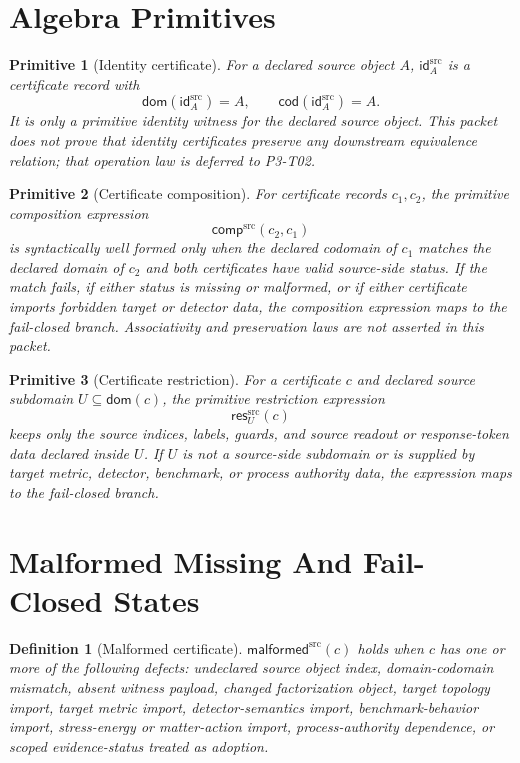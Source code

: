 \documentclass[11pt]{article}
\newcommand{\Cdom}{\mathsf{dom}}
\newcommand{\Ccod}{\mathsf{cod}}
\newcommand{\CId}{\mathsf{id}^{\mathrm{src}}}
\newcommand{\CComp}{\mathsf{comp}^{\mathrm{src}}}
\newcommand{\CRes}{\mathsf{res}^{\mathrm{src}}}
\newcommand{\CMalformed}{\mathsf{malformed}^{\mathrm{src}}}
\newtheorem{definition}{Definition}
\newtheorem{primitive}{Primitive}
\begin{document}
\section{Algebra Primitives}

\begin{primitive}[Identity certificate]
For a declared source object \(A\), \(\CId_A\) is a certificate record with
\[
  \Cdom(\CId_A)=A,\qquad \Ccod(\CId_A)=A.
\]
It is only a primitive identity witness for the declared source object. This
packet does not prove that identity certificates preserve any downstream
equivalence relation; that operation law is deferred to P3-T02.
\end{primitive}

\begin{primitive}[Certificate composition]
For certificate records \(c_1,c_2\), the primitive composition expression
\[
  \CComp(c_2,c_1)
\]
is syntactically well formed only when the declared codomain of \(c_1\)
matches the declared domain of \(c_2\) and both certificates have valid
source-side status. If the match fails, if either status is missing or
malformed, or if either certificate imports forbidden target or detector data,
the composition expression maps to the fail-closed branch. Associativity and
preservation laws are not asserted in this packet.
\end{primitive}

\begin{primitive}[Certificate restriction]
For a certificate \(c\) and declared source subdomain \(U\subseteq\Cdom(c)\),
the primitive restriction expression
\[
  \CRes_U(c)
\]
keeps only the source indices, labels, guards, and source readout or
response-token data declared inside \(U\). If \(U\) is not a source-side
subdomain or is supplied by target metric, detector, benchmark, or process
authority data, the expression maps to the fail-closed branch.
\end{primitive}

\section{Malformed Missing And Fail-Closed States}

\begin{definition}[Malformed certificate]
\(\CMalformed(c)\) holds when \(c\) has one or more of the following defects:
undeclared source object index, domain-codomain mismatch, absent witness
payload, changed factorization object, target topology import, target metric
import, detector-semantics import, benchmark-behavior import, stress-energy
or matter-action import, process-authority dependence, or scoped
evidence-status treated as adoption.
\end{definition}
\end{document}
